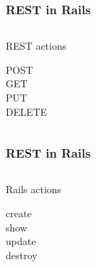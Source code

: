 


\begin{frame}
  \frametitle{REST in Rails}
  \begin{columns}
    \begin{column}{3cm}
      \begin{center}REST actions\\\end{center}
        POST\\
        GET\\
        PUT\\
        DELETE
    \end{column}
  \end{columns}
\end{frame}

\begin{frame}
  \frametitle{REST in Rails}
  \begin{columns}
    \begin{column}{3cm}
      \begin{center}Rails actions\\\end{center}
        create\\
        show\\
        update\\
        destroy\\
    \end{column}
  \end{columns}
\end{frame}

